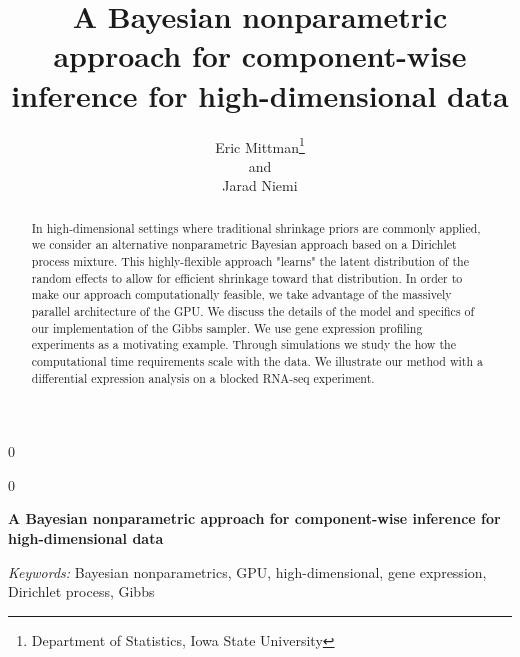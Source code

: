 \documentclass[12pt]{article}
\newcommand{\blind}{0}
\begin{document}
\newtoggle{thesis}
\togglefalse{thesis}

%

\def\spacingset#1{\renewcommand{\baselinestretch}%
{#1}\small\normalsize} \spacingset{1}
  
  
    
    \blind
  {
    \title{\bf A Bayesian nonparametric approach for component-wise inference for high-dimensional data}
    \author{Eric Mittman\thanks{Department of Statistics, Iowa State University}\\
    and\\
    Jarad Niemi\footnotemark[1]}
      
      
    \maketitle
  } \fi
  
  \blind
  {
    \bigskip
    \bigskip
    \bigskip
    \begin{center}
    {\LARGE\bf A Bayesian nonparametric approach for component-wise inference for high-dimensional data}
    \end{center}
    \medskip
  } \fi
  
  \bigskip
  \begin{abstract}
  In high-dimensional settings where traditional shrinkage priors are commonly applied, we consider an alternative nonparametric Bayesian approach based on a Dirichlet process mixture. This highly-flexible approach "learns" the latent distribution of the random effects to allow for efficient shrinkage toward that distribution. In order to make our approach computationally feasible, we take advantage of the massively parallel architecture of the GPU. We discuss the details of the model and specifics of our implementation of the Gibbs sampler. We use gene expression profiling experiments as a motivating example. Through simulations we study the how the computational time requirements scale with the data. We illustrate our method with a differential expression analysis on a blocked RNA-seq experiment.
  \end{abstract}
  
  \noindent%
  {\it Keywords:}  Bayesian nonparametrics, GPU, high-dimensional, gene expression, Dirichlet process, Gibbs
  
  \spacingset{1.45}
  
  
\end{document}
